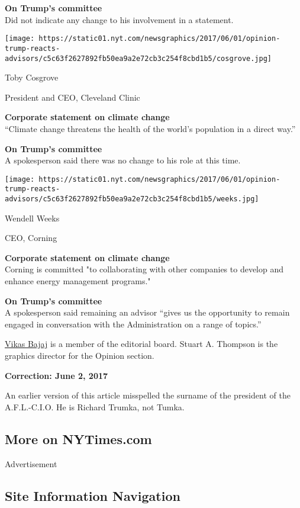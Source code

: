 \textbf{On Trump's committee}\\
Did not indicate any change to his involvement in a statement.

\texttt{[image: https://static01.nyt.com/newsgraphics/2017/06/01/opinion-trump-reacts-advisors/c5c63f2627892fb50ea9a2e72cb3c254f8cbd1b5/cosgrove.jpg]}

Toby Cosgrove

President and CEO, Cleveland Clinic

\textbf{Corporate statement on climate change}\\
``Climate change threatens the health of the world's population in a
direct way.''

\textbf{On Trump's committee}\\
A spokesperson said there was no change to his role at this time.

\texttt{[image: https://static01.nyt.com/newsgraphics/2017/06/01/opinion-trump-reacts-advisors/c5c63f2627892fb50ea9a2e72cb3c254f8cbd1b5/weeks.jpg]}

Wendell Weeks

CEO, Corning

\textbf{Corporate statement on climate change}\\
Corning is committed "to collaborating with other companies to develop
and enhance energy management programs."

\textbf{On Trump's committee}\\
A spokesperson said remaining an advisor ``gives us the opportunity to
remain engaged in conversation with the Administration on a range of
topics.''

\href{https://www.nytimes.com/by/vikas-bajaj}{Vikas Bajaj} is a member
of the editorial board. Stuart A. Thompson is the graphics director for
the Opinion section.

\textbf{Correction: June 2, 2017}

An earlier version of this article misspelled the surname of the
president of the A.F.L.-C.I.O. He is Richard Trumka, not Tumka.

\hypertarget{more-on-nytimescom}{%
\subsection{More on NYTimes.com}\label{more-on-nytimescom}}

Advertisement

\hypertarget{site-information-navigation}{%
\subsection{Site Information
Navigation}\label{site-information-navigation}}

